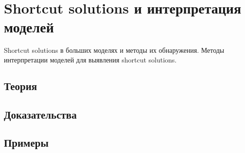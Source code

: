 
\section{Shortcut solutions и интерпретация моделей}
\label{sec:2.5.03-shortcut-solutions}

\begin{ticket}
Shortcut solutions в больших моделях и методы их обнаружения. Методы интерпретации моделей для выявления shortcut solutions.
\end{ticket}

\subsection*{Теория}

\subsection*{Доказательства}

\subsection*{Примеры}
